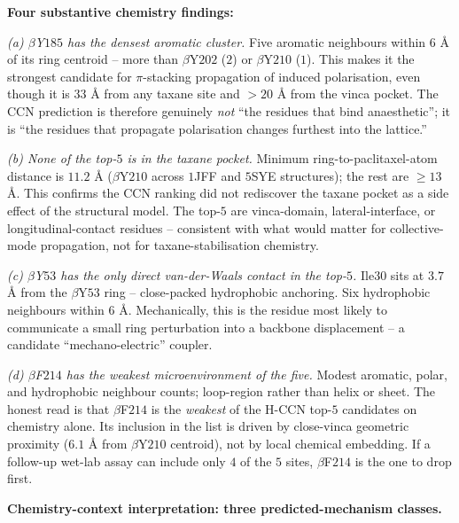 \documentclass[11pt,a4paper]{article}
\begin{document}
\textbf{Four substantive chemistry findings:}

\emph{(a) \boldmath$\beta$Y$185$ has the densest aromatic cluster.}
Five aromatic neighbours within $6$ \AA{} of its ring centroid --
more than $\beta$Y$202$ ($2$) or $\beta$Y$210$ ($1$). This makes it
the strongest candidate for $\pi$-stacking propagation of induced
polarisation, even though it is $33$ \AA{} from any taxane site and
$> 20$ \AA{} from the vinca pocket. The CCN prediction is therefore
genuinely \emph{not} ``the residues that bind anaesthetic''; it is
``the residues that propagate polarisation changes furthest into
the lattice.''

\emph{(b) None of the top-$5$ is in the taxane pocket.} Minimum
ring-to-paclitaxel-atom distance is $11.2$ \AA{} ($\beta$Y$210$
across $1$JFF and $5$SYE structures); the rest are $\geq 13$ \AA.
This confirms the CCN ranking did not rediscover the taxane pocket
as a side effect of the structural model. The top-$5$ are
vinca-domain, lateral-interface, or longitudinal-contact residues
-- consistent with what would matter for collective-mode
propagation, not for taxane-stabilisation chemistry.

\emph{(c) \boldmath$\beta$Y$53$ has the only direct van-der-Waals
contact in the top-$5$.} Ile$30$ sits at $3.7$ \AA{} from the
$\beta$Y$53$ ring -- close-packed hydrophobic anchoring. Six
hydrophobic neighbours within $6$ \AA. Mechanically, this is the
residue most likely to communicate a small ring perturbation into
a backbone displacement -- a candidate ``mechano-electric'' coupler.

\emph{(d) \boldmath$\beta$F$214$ has the weakest microenvironment of
the five.} Modest aromatic, polar, and hydrophobic neighbour counts;
loop-region rather than helix or sheet. The honest read is that
$\beta$F$214$ is the \emph{weakest} of the H-CCN top-$5$ candidates
on chemistry alone. Its inclusion in the list is driven by close-vinca
geometric proximity ($6.1$ \AA{} from $\beta$Y$210$ centroid), not by
local chemical embedding. If a follow-up wet-lab assay can include
only $4$ of the $5$ sites, $\beta$F$214$ is the one to drop first.

\textbf{Chemistry-context interpretation: three predicted-mechanism
classes.}
\end{document}
